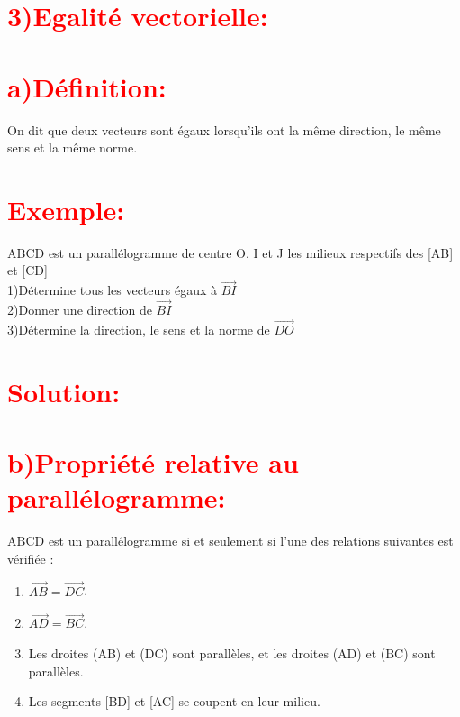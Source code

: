 \documentclass[12pt]{article}
\begin{document}
\section*{\textcolor{red}{\textbf{3)Egalité vectorielle:}}}
\section*{\textcolor{red}{\textbf{a)Définition:}}}
On dit que deux vecteurs sont égaux lorsqu'ils ont la même direction, le même sens et la même norme.
\section*{\textcolor{red}{\textbf{Exemple:}}} 
ABCD est un parallélogramme de centre O. I et J les milieux respectifs des [AB] et [CD]\\
1)Détermine tous les vecteurs égaux à $\vec{BI}$\\
2)Donner une direction de $\vec{BI}$\\
3)Détermine la direction, le sens et la norme de $\vec{DO}$\\
\section*{\textcolor{red}{\textbf{Solution:}}}

\section*{\textcolor{red}{\textbf{b)Propriété relative au parallélogramme:}}}
ABCD est un parallélogramme si et seulement si l'une des relations suivantes est vérifiée :

\begin{enumerate}
  \item $\vec{AB} = \vec{DC}$.
  \item $\vec{AD} = \vec{BC}$.
  \item Les droites (AB) et (DC) sont parallèles, et les droites (AD) et (BC) sont parallèles.
  \item Les segments [BD] et [AC] se coupent en leur milieu.
\end{enumerate}
\end{document}
